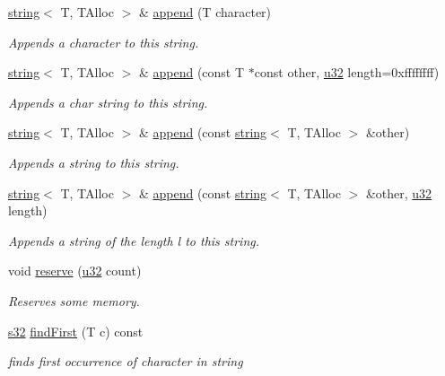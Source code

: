 \begin{DoxyCompactItemize}
\hyperlink{classirr_1_1core_1_1string}{string}$<$ T, T\+Alloc $>$ \& \hyperlink{classirr_1_1core_1_1string_ab0074e616978fceeee4e16abcdb4b921}{append} (T character)
\begin{DoxyCompactList}\small\item\em Appends a character to this string. \end{DoxyCompactList}\item 
\hyperlink{classirr_1_1core_1_1string}{string}$<$ T, T\+Alloc $>$ \& \hyperlink{classirr_1_1core_1_1string_ae1ff59542bd4a7058eca68c7fa128b99}{append} (const T $\ast$const other, \hyperlink{namespaceirr_a0416a53257075833e7002efd0a18e804}{u32} length=0xffffffff)
\begin{DoxyCompactList}\small\item\em Appends a char string to this string. \end{DoxyCompactList}\item 
\hyperlink{classirr_1_1core_1_1string}{string}$<$ T, T\+Alloc $>$ \& \hyperlink{classirr_1_1core_1_1string_ae7fa168face97243eeedfe21e4938d7d}{append} (const \hyperlink{classirr_1_1core_1_1string}{string}$<$ T, T\+Alloc $>$ \&other)
\begin{DoxyCompactList}\small\item\em Appends a string to this string. \end{DoxyCompactList}\item 
\hyperlink{classirr_1_1core_1_1string}{string}$<$ T, T\+Alloc $>$ \& \hyperlink{classirr_1_1core_1_1string_a517b1603ac10860ae5fe0fe6480aa004}{append} (const \hyperlink{classirr_1_1core_1_1string}{string}$<$ T, T\+Alloc $>$ \&other, \hyperlink{namespaceirr_a0416a53257075833e7002efd0a18e804}{u32} length)
\begin{DoxyCompactList}\small\item\em Appends a string of the length l to this string. \end{DoxyCompactList}\item 
void \hyperlink{classirr_1_1core_1_1string_a50492d4949bc9fea58af7e7b1e1d7556}{reserve} (\hyperlink{namespaceirr_a0416a53257075833e7002efd0a18e804}{u32} count)
\begin{DoxyCompactList}\small\item\em Reserves some memory. \end{DoxyCompactList}\item 
\hyperlink{namespaceirr_ac66849b7a6ed16e30ebede579f9b47c6}{s32} \hyperlink{classirr_1_1core_1_1string_afa7db686b05dff5d10b30a900082036b}{find\+First} (T c) const 
\begin{DoxyCompactList}\small\item\em finds first occurrence of character in string \end{DoxyCompactList}\item 

\end{DoxyCompactItemize}
